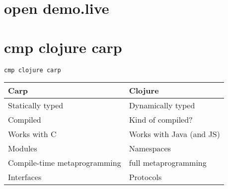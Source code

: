 \documentclass[aspectratio=169]{beamer}
\begin{document}
  \section{open demo.live}
  \section{cmp clojure carp}
  \begin{frame}{\texttt{cmp clojure carp}}
    \begin{tabular}{ l | l }
      Carp & Clojure \\
      \hline
      \hline
      Statically typed & Dynamically typed \\ \hline
      Compiled & Kind of compiled? \\ \hline
      Works with C & Works with Java (and JS) \\ \hline
      \hline
      Modules & Namespaces \\ \hline
      Compile-time metaprogramming & full metaprogramming \\ \hline
      Interfaces & Protocols \\
    \end{tabular}
  \end{frame}
\end{document}

